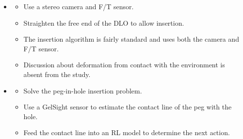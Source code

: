 \begin{itemize}
    \item \cite{nkot-sditfw-97}
    \begin{itemize}
        \item Use a stereo camera and F/T sensor.
        \item Straighten the free end of the DLO to allow insertion.
        \item The insertion algorithm is fairly standard and uses both the camera and F/T sensor.
        \item Discussion about deformation from contact with the environment is absent from the study.
    \end{itemize}
    
    \item \cite{kr-aecsagphi-22}
    \begin{itemize}
        \item Solve the peg-in-hole insertion problem.
        \item Use a GelSight sensor to estimate the contact line of the peg with the hole.
        \item Feed the contact line into an RL model to determine the next action.
    \end{itemize}

\end{itemize}
